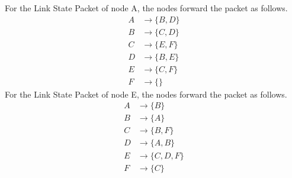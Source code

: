 \documentclass[12pt]{article}
\begin{document}
For the Link State Packet of node A, the nodes forward the packet as follows.
\begin{align*}
    A&\to \{B,D\}\\
    B&\to \{C,D\}\\
    C&\to \{E,F\}\\
    D&\to \{B,E\}\\
    E&\to \{C,F\}\\
    F&\to \{\}
\end{align*}
For the Link State Packet of node E, the nodes forward the packet as follows.
\begin{align*}
    A&\to \{B\}\\
    B&\to \{A\}\\
    C&\to \{B,F\}\\
    D&\to \{A,B\}\\
    E&\to \{C,D,F\}\\
    F&\to \{C\}
\end{align*}
\end{document}
